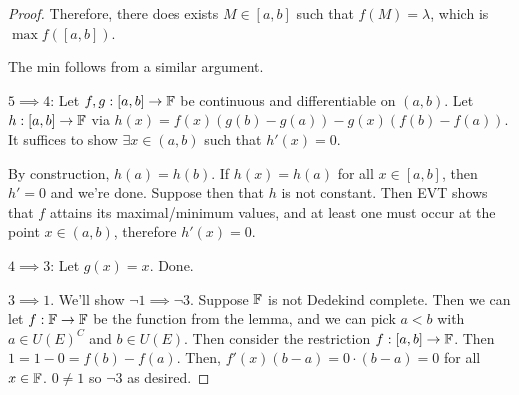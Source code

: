 \documentclass{report}
\begin{document}
\begin{proof}
    Therefore, there does exists $M \in [a,b]$ such that $f(M) = \lambda$, which is $\max f([a,b])$. 

    The min follows from a similar argument. 

    $5 \implies 4$: Let $f, g: [a,b] \to \FF$ be continuous and differentiable on $(a, b)$. Let $h:[a,b]\to \FF$ via $h(x) = f(x)(g(b) - g(a)) - g(x)(f(b) - f(a))$. It suffices to show $\exists x \in (a, b)$ such that $h'(x) = 0$.

    By construction, $h(a) = h(b)$. If $h(x) = h(a)$ for all $x \in [a,b]$, then $h' = 0$ and we're done. Suppose then that $h$ is not constant. Then EVT shows that $f$ attains its maximal/minimum values, and at least one must occur at the point $x \in (a, b)$, therefore $h'(x) = 0$.

    $4 \implies 3$: Let $g(x) = x$. Done.

    $3 \implies 1$. We'll show $\neg 1 \implies \neg 3$. Suppose $\FF$ is not Dedekind complete. Then we can let $f: \FF \to \FF$ be the function from the lemma, and we can pick $a < b$ with $a \in U(E)^C$ and $b \in U(E)$. Then consider the restriction $f:[a,b] \to \FF$. Then $1 = 1 - 0 = f(b) - f(a)$. Then, $f'(x) (b-a) = 0 \cdot(b-a) = 0$ for all $x \in \FF$. $0 \neq 1$ so $\neg 3$ as desired.
\end{proof}
\end{document}
